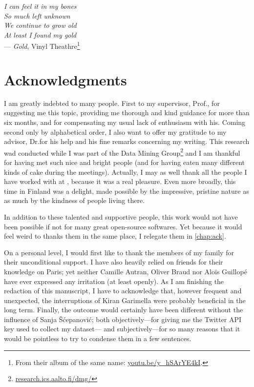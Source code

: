 
\begin{flushright}{\slshape    
		I can feel it in my bones \\
		So much left unknown \\
		We continue to grow old \\
		At least I found my gold
    } \\ \medskip
    --- \emph{Gold}, Vinyl Theathre\footnote{From their album of the same
	    name: \href{https://youtu.be/y_hSArYE4kI?t=2m45s}%
	    {\url{youtu.be/y_hSArYE4kI}}.}
\end{flushright}

\bigskip

\begingroup
\let\clearpage\relax
\let\cleardoublepage\relax
\let\cleardoublepage\relax
\chapter*{Acknowledgments}

I am greatly indebted to many people. First to my supervisor, Prof.\@ \myProf,
for suggesting me this topic, providing me thorough and kind guidance for more
than six months, and for compensating my usual lack of enthusiasm with his.
Coming second only by alphabetical order, I also want to offer my gratitude to
my advisor, Dr.\@ \mySupervisor for his help and his fine remarks concerning my
writing. This research wad conducted while I was part of the
Data Mining Group\footnote{\href{http://research.ics.aalto.fi/dmg/}%
{\url{research.ics.aalto.fi/dmg/}}} and I am thankful for having met such
nice and bright people (and for having eaten many different kinds of cake
during the meetings). Actually, I may as well thank all the people I have
worked with at \myUni, because it was a real pleasure. Even more broadly, this
time in Finland was a delight, made possible by the impressive, pristine nature
as as much by the kindness of people living there.

In addition to these talented and supportive people, this work would not have
been possible if not for many great open-source softwares. Yet because it would
feel weird to thanks them in the same place, I relegate them in \autoref{chap:ack}.

On a personal level, I would first like to thank the members of my family for
their unconditional support. I have also heavily relied on friends for their
knowledge on Paris; yet neither Camille Autran, Oliver Braud nor Aloïs Guillopé
have ever expressed any irritation (at least openly).  As I am finishing the
redaction of this manuscript, I have to acknowledge that, however frequent and
unexpected, the interruptions of Kiran Garimella were probably beneficial in
the long term. Finally, the outcome would certainly have been different without
the influence of Sanja Šćepanović; both objectively---for giving me the Twitter
API key used to collect my dataset--- and subjectively---for so many reasons that
it would be pointless to try to condense them in a few sentences.

\endgroup
